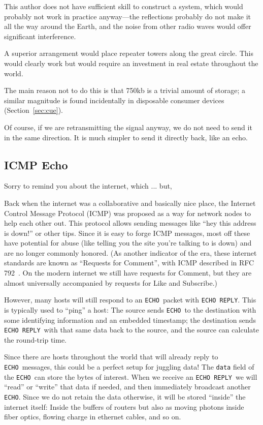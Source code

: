 \documentclass[twocolumn]{article}
\begin{document}
This author does not have sufficient skill to construct a system,
which would probably not work in practice anyway---the reflections
probably do not make it all the way around the Earth, and the noise
from other radio waves would offer significant interference.

A superior arrangement would place repeater towers along the great
circle. This would clearly work but would require an investment
in real estate throughout the world.

The main reason not to do this is that 750kb is a trivial amount
of storage; a similar magnitude is found incidentally in disposable
consumer devices (Section~\ref{sec:cue}).


Of course, if we are retransmitting the signal anyway, we do not need
to send it in the same direction. It is much simpler to send it
directly back, like an echo.

\subsection{ICMP Echo}

Sorry to remind you about the internet, which ... but,

Back when the internet was a collaborative and basically nice place,
the Internet Control Message Protocol (ICMP) was proposed as a way for
network nodes to help each other out. This protocol allows sending
messages like ``hey this address is down!'' or other tips. Since it is
easy to forge ICMP messages, most off these have potential for abuse
(like telling you the site you're talking to is down) and are no
longer commonly honored. (As another indicator of the era, these
internet standards are known as ``Requests for Comment'', with ICMP
described in RFC 792~\cite{rfc792}. On the modern internet we still
have requests for Comment, but they are almost universally accompanied
by requests for Like and Subscribe.)

\newcommand\icmpecho{{\tt ECHO}}
\newcommand\icmpechoreply{{\tt ECHO REPLY}}

However, many hosts will still respond to an \icmpecho\ packet with
\icmpechoreply.
This is typically used to ``ping'' a host: The source sends
\icmpecho\ to the destination with some identifying information and an
embedded timestamp; the destination sends \icmpechoreply\ with that
same data back to the source, and the source can calculate the
round-trip time.

Since there are hosts throughout the world that will already reply to
\icmpecho\ messages, this could be a perfect setup for juggling data!
The {\tt data} field of the \icmpecho\ can store the bytes of interest.
When we receive an \icmpechoreply\ we will ``read'' or ``write'' that
data if needed, and then immediately broadcast another \icmpecho.
Since we do not retain the data otherwise, it will be stored
``inside'' the internet itself: Inside the buffers of routers but also
as moving photons inside fiber optics, flowing charge in ethernet
cables, and so on.
\end{document}
